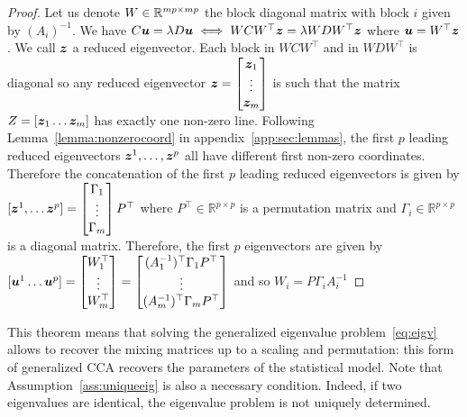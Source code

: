 \begin{proof}
  Let us denote $W \in \mathbb{R}^{mp \times mp}$ the block diagonal matrix with block $i$ given by
  $(A_i)^{-1}$. We have $C \boldsymbol{u} = \lambda D \boldsymbol{u}  \iff W C W^\top \boldsymbol{z} = \lambda W D W^\top \boldsymbol{z}
  $ where $\boldsymbol{u} = W^\top \boldsymbol{z}$. We call $\boldsymbol{z}$ a reduced eigenvector.
  Each
  block in $W C W^\top$ and in $W D W^\top$ is diagonal so any reduced eigenvector $\boldsymbol{z} = \begin{bmatrix} \boldsymbol{z}_1 \\ \vdots \\ \boldsymbol{z}_m \end{bmatrix}$ is
  such that the matrix $Z = [\boldsymbol{z}_1 \dots \boldsymbol{z}_m]$ has exactly one non-zero line.
  Following Lemma~\ref{lemma:nonzerocoord} in appendix~\ref{app:sec:lemmas}, the first $p$ leading reduced
  eigenvectors $\boldsymbol{z}^1, \dots, \boldsymbol{z}^p$ all have different first non-zero coordinates.
  Therefore the concatenation of the first $p$ leading reduced eigenvectors is given
  by $[\boldsymbol{z}^1, \dots \boldsymbol{z}^p] = \begin{bmatrix} \Gamma_1 \\ \vdots \\ \Gamma_m \end{bmatrix} P^{\top}$ where $P^{\top} \in \mathbb{R}^{p \times p}$ is a permutation matrix and $\Gamma_i
  \in \mathbb{R}^{p \times p}$ is a diagonal matrix. Therefore, the first $p$
  eigenvectors are given by $[\boldsymbol{u}^1 \dots \boldsymbol{u}^p] = \begin{bmatrix} W_1^{\top} \\ \vdots \\ W_m^{\top} \end{bmatrix} = \begin{bmatrix} (A_1^{-1})^{\top} \Gamma_1 P^{\top} \\ \vdots \\ (A_m^{-1})^{\top} \Gamma_m P^{\top} \end{bmatrix}$  and so $W_i = P \Gamma_i A_i^{-1}$
\end{proof}

This theorem means that solving the generalized eigenvalue problem~\eqref{eq:eigv} allows to recover the mixing matrices up to a scaling and permutation: this form of generalized CCA recovers the parameters of the statistical model.
Note that Assumption~\ref{ass:uniqueeig} is also a necessary condition. Indeed, if two eigenvalues are identical, the eigenvalue problem is not uniquely determined.

